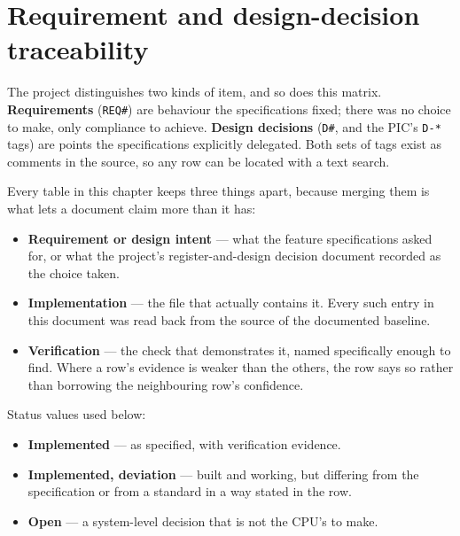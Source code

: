 \chapter{Requirement and design-decision traceability}
\label{ch:trace}

The project distinguishes two kinds of item, and so does this matrix.
\textbf{Requirements} (\texttt{REQ\#}) are behaviour the specifications fixed;
there was no choice to make, only compliance to achieve. \textbf{Design
decisions} (\texttt{D\#}, and the PIC's \texttt{D-*} tags) are points the
specifications explicitly delegated. Both sets of tags exist as comments in the
source, so any row can be located with a text search.

Every table in this chapter keeps three things apart, because merging them is
what lets a document claim more than it has:

\begin{itemize}[nosep]
  \item \textbf{Requirement or design intent} --- what the feature
        specifications asked for, or what the project's register-and-design
        decision document recorded as the choice taken.
  \item \textbf{Implementation} --- the file that actually contains it. Every
        such entry in this document was read back from the source of the
        documented baseline.
  \item \textbf{Verification} --- the check that demonstrates it, named
        specifically enough to find. Where a row's evidence is weaker than the
        others, the row says so rather than borrowing the neighbouring row's
        confidence.
\end{itemize}

Status values used below:

\begin{itemize}[nosep]
  \item \textbf{Implemented} --- as specified, with verification evidence.
  \item \textbf{Implemented, deviation} --- built and working, but differing from
        the specification or from a standard in a way stated in the row.
  \item \textbf{Open} --- a system-level decision that is not the CPU's to make.
\end{itemize}

